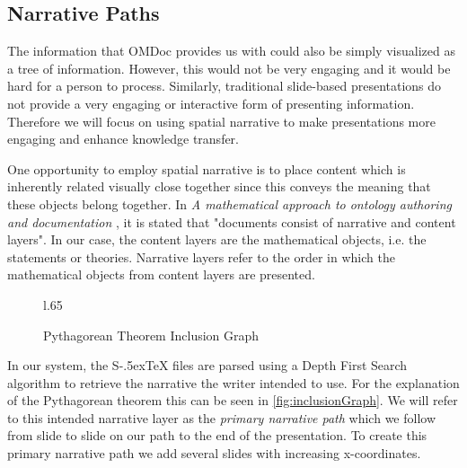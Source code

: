 \documentclass{llncs}
\def\stex{\texorpdfstring{\raisebox{-.5ex}S\kern-.5ex\TeX}{sTeX}\xspace}
\begin{document}
\subsection{Narrative Paths}
\label{sec:narrativePaths}

The information that OMDoc provides us with could also be simply visualized as a tree of information. However, this would not be very engaging and it would be hard for a person to process. Similarly, traditional slide-based presentations do not provide a very engaging or interactive form of presenting information. Therefore we will focus on using spatial narrative to make presentations more engaging and enhance knowledge transfer. 

One opportunity to employ spatial narrative is to place content which is inherently related visually close together since this conveys the meaning that these objects belong together. In \textit{A mathematical approach to ontology authoring and documentation} \cite{LK:MathOntoAuthDoc09}, it is stated that "documents consist of narrative and content layers". In our case, the content layers are the mathematical objects, i.e. the statements or theories. Narrative layers refer to the order in which the mathematical objects from content layers are presented.

\begin{figure}l{.65\textwidth}\vspace{-2em}
  \vspace{-1.8em}
  \caption{Pythagorean Theorem Inclusion Graph}\label{fig:inclusionGraph}
  \vspace{-2em}
\end{figure}

In our system, the \stex files are parsed using a Depth First Search algorithm to retrieve the narrative the writer intended to use. For the explanation of the Pytha\-go\-rean theorem this can be seen in \autoref{fig:inclusionGraph}. We will refer to this intended narrative layer as the \textit{primary narrative path} which we follow from slide to slide on our path to the end of the presentation. To create this primary narrative path we add several slides with increasing x-coordinates.
\end{document}
